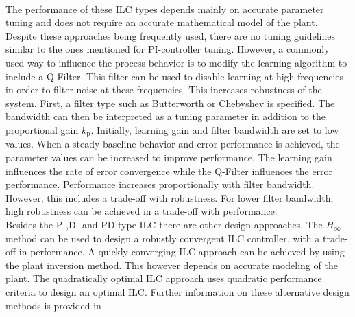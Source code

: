 \\The performance of these ILC types depends mainly on accurate parameter tuning and does not require an accurate mathematical model of the plant. Despite these approaches being frequently used, there are no tuning guidelines similar to the ones mentioned for PI-controller tuning. However, a commonly used way to influence the process behavior is to modify the learning algorithm to include a Q-Filter. This filter can be used to disable learning at high frequencies in order to filter noise at these frequencies. This increases robustness of the system. First, a filter type such as Butterworth or Chebyshev is specified. The bandwidth can then be interpreted as a tuning parameter in addition to the proportional gain $k_{\mathrm{p}}$. Initially, learning gain and filter bandwidth are set to low values. When a steady baseline behavior and error performance is achieved, the parameter values can be increased to improve performance. The learning gain influences the rate of error convergence while the Q-Filter influences the error performance. Performance increases proportionally with filter bandwidth. However, this includes a trade-off with robustness. For lower filter bandwidth, high robustness can be achieved in a trade-off with performance.
\\Besides the P-,D- and PD-type ILC there are other design approaches. The $H_{\infty}$ method can be used to design a robustly convergent ILC controller, with a trade-off in performance. A quickly converging ILC approach can be achieved by using the plant inversion method. This however depends on accurate modeling of the plant. The quadratically optimal ILC approach uses quadratic performance criteria to design an optimal ILC. Further information on these alternative design methods is provided in \cite{ILC2}.
